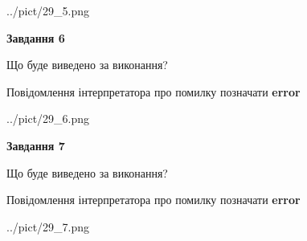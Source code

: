 \documentclass[10pt, ukrainian]{article}
\begin{document}
{\begin {large}
\begin{center}
	{../pict/29_5.png}
\end{center}
\newpage

{\begin {center}\textbf{Завдання 6}\end {center}}\par
Що буде виведено за виконання? \par
Повідомлення інтерпретатора про помилку позначати \textbf{error}

\begin{center}
	{../pict/29_6.png}
\end{center}
\newpage

{\begin {center}\textbf{Завдання 7}\end {center}}\par
Що буде виведено за виконання? \par
Повідомлення інтерпретатора про помилку позначати \textbf{error}

\begin{center}
	{../pict/29_7.png}
\end{center}
\newpage

\end {large}}
\end{document}
